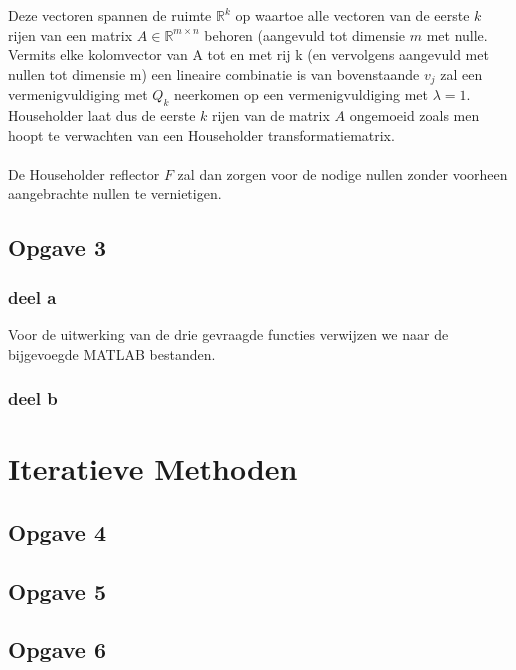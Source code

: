 \documentclass[een]{practicumverslag}
\begin{document}
Deze vectoren spannen de ruimte $\mathbb{R}^k$ op waartoe alle vectoren
van de eerste $k$ rijen van een matrix $A \in \mathbb{R}^{m \times n}$ behoren (aangevuld tot dimensie $m$ met nulle. 
Vermits elke kolomvector van A tot en met rij k (en vervolgens aangevuld met nullen tot dimensie m) een lineaire combinatie is van bovenstaande $v_j$ zal een vermenigvuldiging met $Q_k$ neerkomen op een vermenigvuldiging met $\lambda = 1$. Householder laat dus de eerste $k$ rijen van de matrix $A$ ongemoeid zoals men hoopt te verwachten van een Householder transformatiematrix.\\
\\
De Householder reflector $F$ zal dan zorgen voor de nodige nullen zonder voorheen aangebrachte nullen te vernietigen.

\pagebreak
\subsection*{Opgave 3}

\subsubsection{deel a}

Voor de uitwerking van de drie gevraagde functies verwijzen we naar de bijgevoegde MATLAB bestanden.

\subsubsection{deel b}

\lipsum[9-9]

\section{Iteratieve Methoden}

\subsection*{Opgave 4}

\lipsum[3-3]

\subsection*{Opgave 5}

\lipsum[7-7]

\subsection*{Opgave 6}
\end{document}
